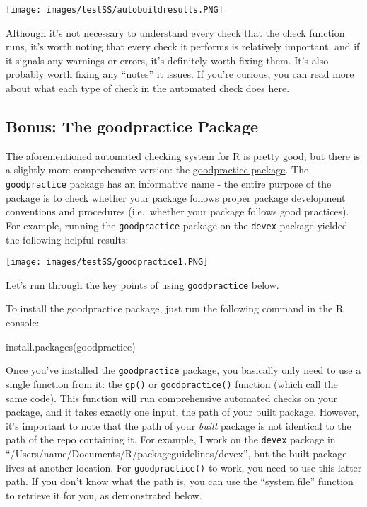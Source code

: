 \documentclass[
]{book}
\newenvironment{Shaded}{\begin{snugshade}}{\end{snugshade}}
\newcommand{\FunctionTok}[1]{\textcolor[rgb]{0.00,0.00,0.00}{#1}}
\newcommand{\NormalTok}[1]{#1}
\newcommand{\StringTok}[1]{\textcolor[rgb]{0.31,0.60,0.02}{#1}}
\begin{document}
\texttt{[image: images/testSS/autobuildresults.PNG]}

Although it's not necessary to understand every check that the check function runs, it's worth noting that every check it performs is relatively important, and if it signals any warnings or errors, it's definitely worth fixing them. It's also probably worth fixing any ``notes'' it issues. If you're curious, you can read more about what each type of check in the automated check does \href{http://r-pkgs.had.co.nz/check.html\#check}{here}.

\hypertarget{bonus-the-goodpractice-package}{%
\subsection{Bonus: The goodpractice Package}\label{bonus-the-goodpractice-package}}

The aforementioned automated checking system for R is pretty good, but there is a slightly more comprehensive version: the \href{https://github.com/MangoTheCat/goodpractice/blob/master/vignettes/goodpractice.Rmd}{goodpractice package}. The \texttt{goodpractice} package has an informative name - the entire purpose of the package is to check whether your package follows proper package development conventions and procedures (i.e.~whether your package follows good practices). For example, running the \texttt{goodpractice} package on the \texttt{devex} package yielded the following helpful results:

\texttt{[image: images/testSS/goodpractice1.PNG]}

Let's run through the key points of using \texttt{goodpractice} below.

To install the goodpractice package, just run the following command in the R console:

\begin{Shaded}
\begin{Highlighting}[]
\FunctionTok{install.packages}\NormalTok{(}\StringTok{\textquotesingle{}goodpractice\textquotesingle{}}\NormalTok{)}
\end{Highlighting}
\end{Shaded}

Once you've installed the \texttt{goodpractice} package, you basically only need to use a single function from it: the \texttt{gp()} or \texttt{goodpractice()} function (which call the same code). This function will run comprehensive automated checks on your package, and it takes exactly one input, the path of your built package. However, it's important to note that the path of your \emph{built} package is not identical to the path of the repo containing it. For example, I work on the \texttt{devex} package in ``/Users/name/Documents/R/packageguidelines/devex'', but the built package lives at another location. For \texttt{goodpractice()} to work, you need to use this latter path. If you don't know what the path is, you can use the ``system.file'' function to retrieve it for you, as demonstrated below.
\end{document}
